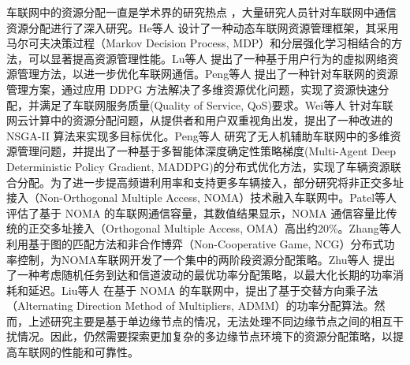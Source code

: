 车联网中的资源分配一直是学术界的研究热点 \cite{noor-a-rahim2022a}，大量研究人员针对车联网中通信资源分配进行了深入研究。He等人 \cite{he2022meta} 设计了一种动态车联网资源管理框架，其采用马尔可夫决策过程（Markov Decision Process, MDP）和分层强化学习相结合的方法，可以显著提高资源管理性能。Lu等人 \cite{lu2021user} 提出了一种基于用户行为的虚拟网络资源管理方法，以进一步优化车联网通信。Peng等人 \cite{peng2020deep} 提出了一种针对车联网的资源管理方案，通过应用 DDPG 方法解决了多维资源优化问题，实现了资源快速分配，并满足了车联网服务质量(Quality of Service, QoS)要求。Wei等人 \cite{wei2022multi} 针对车联网云计算中的资源分配问题，从提供者和用户双重视角出发，提出了一种改进的 NSGA-II 算法来实现多目标优化。Peng等人 \cite{peng2021multi} 研究了无人机辅助车联网中的多维资源管理问题，并提出了一种基于多智能体深度确定性策略梯度(Multi-Agent Deep Deterministic Policy Gradient, MADDPG)的分布式优化方法，实现了车辆资源联合分配。为了进一步提高频谱利用率和支持更多车辆接入，部分研究将非正交多址接入（Non-Orthogonal Multiple Access, NOMA）技术融入车联网中。Patel等人 \cite{patel2021performance} 评估了基于 NOMA 的车联网通信容量，其数值结果显示，NOMA 通信容量比传统的正交多址接入（Orthogonal Multiple Access, OMA）高出约20\%。Zhang等人 \cite{zhang2021centralized} 利用基于图的匹配方法和非合作博弈（Non-Cooperative Game, NCG）分布式功率控制，为NOMA车联网开发了一个集中的两阶段资源分配策略。Zhu等人 \cite{zhu2021decentralized} 提出了一种考虑随机任务到达和信道波动的最优功率分配策略，以最大化长期的功率消耗和延迟。Liu等人 \cite{liu2019energy} 在基于 NOMA 的车联网中，提出了基于交替方向乘子法（Alternating Direction Method of Multipliers, ADMM）的功率分配算法。然而，上述研究主要是基于单边缘节点的情况，无法处理不同边缘节点之间的相互干扰情况。因此，仍然需要探索更加复杂的多边缘节点环境下的资源分配策略，以提高车联网的性能和可靠性。


